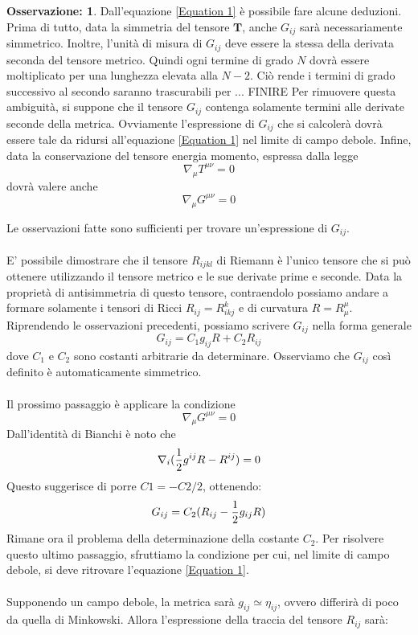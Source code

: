 \documentclass[]{report}
\theoremstyle{definition}
\theoremstyle{Theorem}
\theoremstyle{definition}
\theoremstyle{definition}
\theoremstyle{definition}
\newtheorem{Obs}[Def]{Osservazione:}
\begin{document}
\begin{Obs}
	Dall'equazione \ref{Equation 1} è possibile fare alcune deduzioni. Prima di tutto, data la simmetria del tensore $\textbf{T}$, anche $G_{ij}$ sarà necessariamente simmetrico. Inoltre, l'unità di misura di $G_{ij}$ deve essere la stessa della derivata seconda del tensore metrico. Quindi ogni termine di grado $N$ dovrà essere moltiplicato per una lunghezza elevata alla $N-2$. Ciò rende i termini di grado successivo al secondo saranno trascurabili per ... FINIRE
	Per rimuovere questa ambiguità, si suppone che il tensore $G_{ij}$ contenga solamente termini alle derivate seconde della metrica. Ovviamente l'espressione di $G_{ij}$ che si calcolerà dovrà essere tale da ridursi all'equazione \ref{Equation 1} nel limite di campo debole.
	Infine, data la conservazione del tensore energia momento, espressa dalla legge 
	$$\nabla_\mu T^{\mu\nu}=0$$
	dovrà valere anche 
	$$\nabla_\mu G^{\mu\nu}=0$$
\end{Obs}
Le osservazioni fatte sono sufficienti per trovare un'espressione di $G_{ij}$.\\
\\
E' possibile dimostrare che il tensore $R_{ijkl}$ di Riemann è l'unico tensore che si può ottenere utilizzando il tensore metrico e le sue derivate prime e seconde. Data la proprietà di antisimmetria di questo tensore, contraendolo possiamo andare a formare solamente i tensori di Ricci $R_{ij}=R^k_{ikj}$ e di curvatura $R=R^\mu_\mu$. Riprendendo le osservazioni precedenti, possiamo scrivere $G_{ij}$ nella forma generale
$$G_{ij}=C_1g_{ij}R+C_2R_{ij}$$
dove $C_1$ e $C_2$ sono costanti arbitrarie da determinare.
Osserviamo che $G_{ij}$ così definito è automaticamente simmetrico.\\
\\
Il prossimo passaggio è applicare la condizione $$\nabla_\mu G^{\mu\nu}=0$$
Dall'identità di Bianchi è noto che
$$\nabla_i({1\over 2}g^{ij}R-R^{ij})=0$$
Questo suggerisce di porre $C1=-C2/2$, ottenendo:
\begin{equation}
	\label{Equation 2}
	G_{ij}=C_2(R_{ij}-{1\over 2}g_{ij}R)
\end{equation}
Rimane ora il problema della determinazione della costante $C_2$. Per risolvere questo ultimo passaggio, sfruttiamo la condizione per cui, nel limite di campo debole, si deve ritrovare l'equazione \ref{Equation 1}.\\
\\
Supponendo un campo debole, la metrica sarà $g_{ij}\simeq \eta_{ij}$, ovvero differirà di poco da quella di Minkowski. Allora l'espressione della traccia del tensore $R_{ij}$ sarà:
\end{document}
